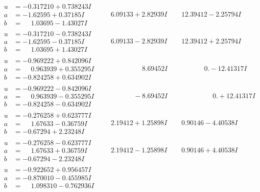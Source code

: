\documentclass[1p]{elsarticle_modified}
\theoremstyle{definition}
\begin{document}
$$\begin{array}{c|c|c}
\begin{aligned}
u &= -0.317210 + 0.738243 I \\
a &= -1.62595 + 0.37185 I \\
b &= \phantom{-}1.03695 - 1.43027 I\end{aligned}
 & \phantom{-}6.09133 + 2.82939 I & \phantom{-}12.39412 - 2.25794 I \\ \hline\begin{aligned}
u &= -0.317210 - 0.738243 I \\
a &= -1.62595 - 0.37185 I \\
b &= \phantom{-}1.03695 + 1.43027 I\end{aligned}
 & \phantom{-}6.09133 - 2.82939 I & \phantom{-}12.39412 + 2.25794 I \\ \hline\begin{aligned}
u &= -0.969222 + 0.842096 I \\
a &= \phantom{-}0.963939 + 0.355295 I \\
b &= -0.824258 + 0.634902 I\end{aligned}
 & \phantom{-0.000000 -}8.69452 I & \phantom{-0.000000 } 0. - 12.41317 I \\ \hline\begin{aligned}
u &= -0.969222 - 0.842096 I \\
a &= \phantom{-}0.963939 - 0.355295 I \\
b &= -0.824258 - 0.634902 I\end{aligned}
 & \phantom{-0.000000 } -8.69452 I & \phantom{-0.000000 -}0. + 12.41317 I \\ \hline\begin{aligned}
u &= -0.276258 + 0.623777 I \\
a &= \phantom{-}1.67633 - 0.36759 I \\
b &= -0.67294 + 2.23248 I\end{aligned}
 & \phantom{-}2.19412 + 1.25898 I & \phantom{-}0.90146 - 4.40538 I \\ \hline\begin{aligned}
u &= -0.276258 - 0.623777 I \\
a &= \phantom{-}1.67633 + 0.36759 I \\
b &= -0.67294 - 2.23248 I\end{aligned}
 & \phantom{-}2.19412 - 1.25898 I & \phantom{-}0.90146 + 4.40538 I \\ \hline\begin{aligned}
u &= -0.922652 + 0.956457 I \\
a &= -0.870010 - 0.455985 I \\
b &= \phantom{-}1.098310 - 0.762936 I\end{aligned}

\end{array}$$
\end{document}

